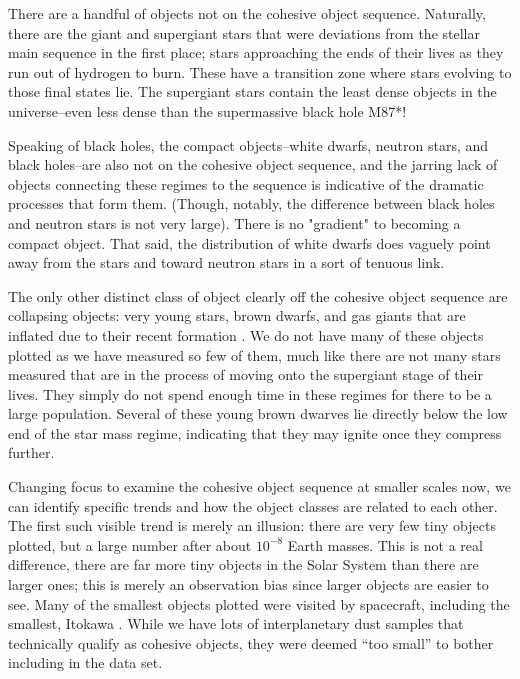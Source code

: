 \documentclass[twocolumn,linenumbers]{aastex631}
\begin{document}
There are a handful of objects not on the cohesive object sequence. Naturally, there are the giant and supergiant stars that were deviations from the stellar main sequence in the first place; stars approaching the ends of their lives as they run out of hydrogen to burn. These have a transition zone where stars evolving to those final states lie. The supergiant stars contain the least dense objects in the universe--even less dense than the supermassive black hole M87*!

Speaking of black holes, the compact objects--white dwarfs, neutron stars, and black holes--are also not on the cohesive object sequence, and the jarring lack of objects connecting these regimes to the sequence is indicative of the dramatic processes that form them. (Though, notably, the difference between black holes and neutron stars is not very large). There is no "gradient" to becoming a compact object. That said, the distribution of white dwarfs does vaguely point away from the stars and toward neutron stars in a sort of tenuous link. 

The only other distinct class of object clearly off the cohesive object sequence are collapsing objects: very young stars, brown dwarfs, and gas giants that are inflated due to their recent formation \citep{Hartmann2016, Muller2021}. We do not have many of these objects plotted as we have measured so few of them, much like there are not many stars measured that are in the process of moving onto the supergiant stage of their lives. They simply do not spend enough time in these regimes for there to be a large population. Several of these young brown dwarves lie directly below the low end of the star mass regime, indicating that they may ignite once they compress further. 

Changing focus to examine the cohesive object sequence at smaller scales now, we can identify specific trends and how the object classes are related to each other. The first such visible trend is merely an illusion: there are very few tiny objects plotted, but a large number after about $10^{-8}$ Earth masses. This is not a real difference, there are far more tiny objects in the Solar System than there are larger ones; this is merely an observation bias since larger objects are easier to see. Many of the smallest objects plotted were visited by spacecraft, including the smallest, Itokawa \citep{Carry2012}. While we have lots of interplanetary dust samples that technically qualify as cohesive objects, they were deemed ``too small'' to bother including in the data set.
\end{document}
